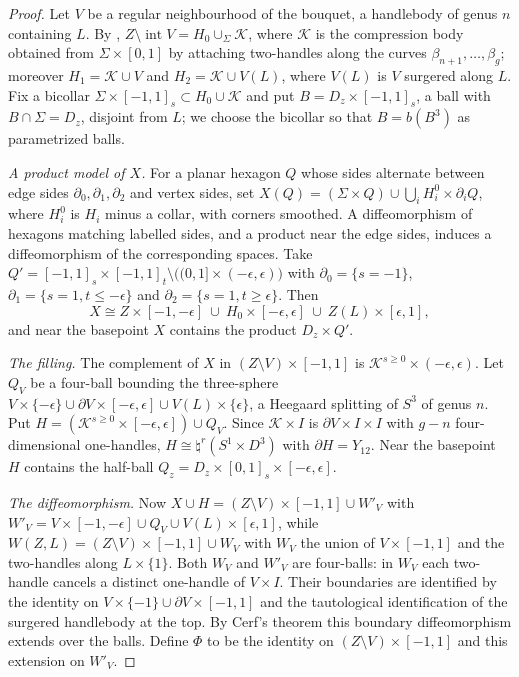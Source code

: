 \documentclass[11pt]{amsart}
\theoremstyle{definition}
\theoremstyle{remark}
\theoremstyle{plain}
\numberwithin{equation}{section}
\begin{document}
\begin{proof}
Let $V$ be a regular neighbourhood of the bouquet, a handlebody of genus
$n$ containing $L$. By \cite[Definition~4.2]{OS-triangles},
$Z\setminus\operatorname{int}V=H_0\cup_\Sigma\mathcal K$, where
$\mathcal K$ is the compression body obtained from $\Sigma\times[0,1]$
by attaching two-handles along the curves $\beta_{n+1},\dots,\beta_g$;
moreover $H_1=\mathcal K\cup V$ and $H_2=\mathcal K\cup V(L)$, where
$V(L)$ is $V$ surgered along $L$. Fix a bicollar
$\Sigma\times[-1,1]_s\subset H_0\cup\mathcal K$ and put
$B=D_z\times[-1,1]_s$, a ball with $B\cap\Sigma=D_z$, disjoint from $L$; we
choose the bicollar so that $B=b(B^3)$ as parametrized balls.

\emph{A product model of $X$.} For a planar hexagon $Q$ whose sides
alternate between edge sides $\partial_0,\partial_1,\partial_2$ and
vertex sides, set $X(Q)=(\Sigma\times Q)\cup\bigcup_i H_i^0\times
\partial_iQ$, where $H_i^0$ is $H_i$ minus a collar, with corners
smoothed. A diffeomorphism of hexagons matching labelled sides, and a
product near the edge sides, induces a diffeomorphism of the
corresponding spaces. Take
$Q'=[-1,1]_s\times[-1,1]_t\setminus\bigl((0,1]\times(-\epsilon,\epsilon)
\bigr)$ with $\partial_0=\{s=-1\}$, $\partial_1=\{s=1,t\le-\epsilon\}$
and $\partial_2=\{s=1,t\ge\epsilon\}$. Then
\[
X\cong Z\times[-1,-\epsilon]\ \cup\ H_0\times[-\epsilon,\epsilon]\ \cup\
Z(L)\times[\epsilon,1],
\]
and near the basepoint $X$ contains the product $D_z\times Q'$.

\emph{The filling.} The complement of $X$ in
$(Z\setminus V)\times[-1,1]$ is $\mathcal K^{s\ge0}\times
(-\epsilon,\epsilon)$. Let $Q_V$ be a four-ball bounding the three-sphere
$V\times\{-\epsilon\}\cup\partial V\times[-\epsilon,\epsilon]\cup
V(L)\times\{\epsilon\}$, a Heegaard splitting of $S^3$ of genus $n$.
Put $H=(\mathcal K^{s\ge0}\times[-\epsilon,\epsilon])\cup Q_V$. Since
$\mathcal K\times I$ is $\partial V\times I\times I$ with $g-n$
four-dimensional one-handles, $H\cong\natural^r(S^1\times D^3)$ with
$\partial H=Y_{12}$. Near the basepoint $H$ contains the half-ball
$Q_z=D_z\times[0,1]_s\times[-\epsilon,\epsilon]$.

\emph{The diffeomorphism.} Now
$X\cup H=(Z\setminus V)\times[-1,1]\cup W'_V$ with
$W'_V=V\times[-1,-\epsilon]\cup Q_V\cup V(L)\times[\epsilon,1]$, while
$W(Z,L)=(Z\setminus V)\times[-1,1]\cup W_V$ with $W_V$ the union of
$V\times[-1,1]$ and the two-handles along $L\times\{1\}$. Both $W_V$ and
$W'_V$ are four-balls: in $W_V$ each two-handle cancels a distinct
one-handle of $V\times I$. Their boundaries are identified by the
identity on $V\times\{-1\}\cup\partial V\times[-1,1]$ and the
tautological identification of the surgered handlebody at the top. By
Cerf's theorem \cite{Cerf} this boundary diffeomorphism extends over the
balls. Define $\Phi$ to be the identity on $(Z\setminus V)\times[-1,1]$
and this extension on $W'_V$.


\end{proof}
\end{document}

